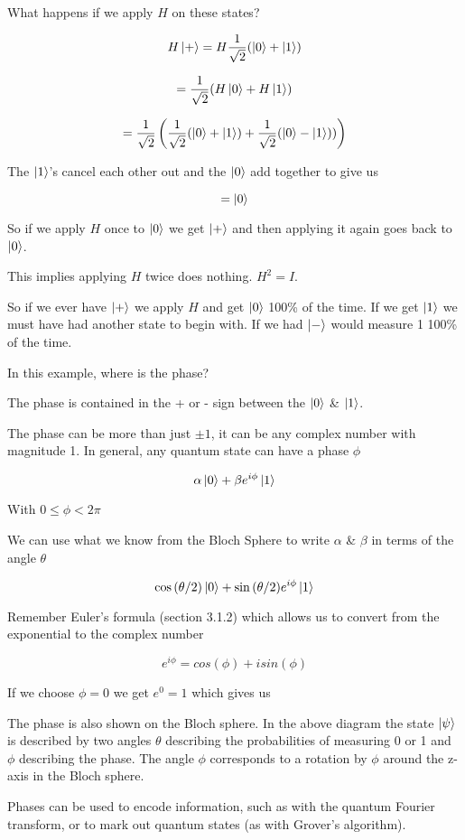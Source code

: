 \documentclass{book}
\begin{document}
What happens if we apply $H$ on these states? 

$$ H\ket{+} = H \frac{1}{\sqrt{2}} ( \ket{0} + \ket{1})$$

$$= \frac{1}{\sqrt{2}} (H\ket{0} + H\ket{1})$$

$$ = \frac{1}{\sqrt{2}}\left( \frac{1}{\sqrt{2}}(\ket{0} + \ket{1})+\frac{1}{\sqrt{2}}(\ket{0} - \ket{1}))  \right)$$

The $\ket{1}$'s cancel each other out and the $\ket{0}$ add together to give us

$$ = \ket{0} $$

So if we apply $H$ once to $\ket{0}$ we get $\ket{+}$ and then applying it again goes back to $\ket{0}$. 

This implies applying $H$ twice does nothing. $H^2 = I$.

So if we ever have $\ket{+}$ we apply $H$ and get $\ket{0}$ 100\% of the time. If we get $\ket{1}$ we must have had another state to begin with. If we had $\ket{-}$ would measure 1 100\% of the time. 

In this example, where is the phase? 

The phase is contained in the + or - sign between the $\ket{0}$ \& $\ket{1}$. 

The phase can be more than just $\pm 1$, it can be any complex number with magnitude 1. In general, any quantum state can have a phase $\phi$ 

$$ \alpha\ket{0} + \beta e^{i\phi}\ket{1} $$

With $ 0 \leq \phi < 2\pi $

We can use what we know from the Bloch Sphere to write $\alpha$ \& $\beta$ in terms of the angle $\theta$

$$ \cos{(\theta/2)}\ket{0} + \sin{(\theta/2)} e^{i\phi}\ket{1} $$

Remember Euler's formula (section 3.1.2) which allows us to convert from the exponential to the complex number

$$ e^{i \phi} = cos(\phi) + i sin(\phi) $$

If we choose $\phi = 0$ we get $e^0 = 1$ which gives us 

The phase is also shown on the Bloch sphere. In the above diagram the state $\ket{\psi}$ is described by two angles $\theta$ describing the probabilities of measuring 0 or 1 and $\phi$ describing the phase. The angle $\phi$ corresponds to a rotation by $\phi$ around the z-axis in the Bloch sphere.  

Phases can be used to encode information, such as with the quantum Fourier transform, or to mark out quantum states (as with Grover's algorithm). 
\end{document}
